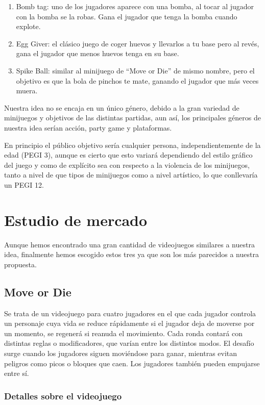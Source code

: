 \documentclass[12pt, spanish]{article}
\begin{document}
\begin{enumerate}
	\item Bomb tag: uno de los jugadores aparece con una bomba, al tocar al jugador con la bomba se la robas. Gana el jugador que tenga la bomba cuando explote.
	\item Egg Giver: el clásico juego de coger huevos y llevarlos a tu base pero al revés, gana el jugador que menos huevos tenga en su base.
	\item Spike Ball: similar al minijuego de “Move or Die” de mismo nombre, pero el objetivo es que la bola de pinchos te mate, ganando el jugador que más veces muera.
\end{enumerate}


Nuestra idea no se encaja en un único género, debido a la gran variedad de minijuegos y objetivos de las distintas partidas, aun así, los principales géneros de nuestra idea serían acción, party game y plataformas.

En principio el público objetivo sería cualquier persona, independientemente de la edad (PEGI 3), aunque es cierto que esto variará dependiendo del estilo gráfico del juego y como de explícito sea con respecto a la violencia de los minijuegos, tanto a nivel de que tipos de minijuegos como a nivel artístico, lo que conllevaría un PEGI 12.

\section{Estudio de mercado}

Aunque hemos encontrado una gran cantidad de videojuegos similares a nuestra idea, finalmente hemos escogido estos tres ya que son los más parecidos a nuestra propuesta.

\subsection{Move or Die}

Se trata de un videojuego para cuatro jugadores en el que cada jugador controla un personaje cuya vida se reduce rápidamente si el jugador deja de moverse por un momento, se regenerá si reanuda el movimiento. Cada ronda contará con distintas reglas o modificadores, que varían entre los distintos modos. El desafío surge cuando los jugadores siguen moviéndose para ganar, mientras evitan peligros como picos o bloques que caen. Los jugadores también pueden empujarse entre sí.


\subsubsection{Detalles sobre el videojuego}
\end{document}
